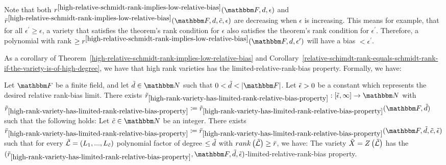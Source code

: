 \begin{remark}\label{in-high-relative-rank-implies-low-relative-bias-epsilon-increasing-rank-requirment-decreasing}
Note that both $\rankval^{\ref{high-relative-schmidt-rank-implies-low-relative-bias}}(\basefield, \degree, \epsilon)$
and $\varietyrankval^{\ref{high-relative-schmidt-rank-implies-low-relative-bias}}(\basefield, \degree, \varietypolycount, \epsilon)$
are decreasing when $\epsilon$ is increasing.
This means for example, that for all $\epsilon^\prime \geq \epsilon$,
a variety that satisfies the theorem's rank condition for $\epsilon$ also satisfies the theorem's rank condition for $\epsilon^\prime$.
Therefore, a polynomial with rank $\geq \rankval^{\ref{high-relative-schmidt-rank-implies-low-relative-bias}}(\basefield, \degree, \epsilon^\prime)$
will have a bias $< \epsilon^\prime$.
\end{remark}
As a corollary of Theorem~\ref{high-relative-schmidt-rank-implies-low-relative-bias} and Corollary~\ref{relative-schimdt-rank-equals-schmidt-rank-if-the-variety-is-of-high-degree}, we have that
high rank varieties has the limited-relative-rank-bias property.
Formally, we have:
\begin{corollary}\label{high-rank-variety-has-limited-rank-relative-bias-property}
    Let $\basefield$ be a finite field, and let $\varietydeg \in \naturalnumbersset$ such that $0 < \varietydeg < \abs{\basefield}$.
    Let ${\tilde{\epsilon}} > 0$ be a constant which represents the desired relative rank-bias limit.
    There exists $\funcdef{\rankbiasfunc_{\ref{high-rank-variety-has-limited-rank-relative-bias-property}}}{[\epsilonlimitedrankbias, \infty]}{\naturalnumbersset}$ with $\rankbiasfunc_{\ref{high-rank-variety-has-limited-rank-relative-bias-property}} \definedas \rankbiasfunc_{\ref{high-rank-variety-has-limited-rank-relative-bias-property}}(\basefield, \varietydeg)$
    such that the following holds:
    \newline
    Let $\varietypolycount \in \naturalnumbersset$ be an integer.
    There exists $\varietyrankval_{\ref{high-rank-variety-has-limited-rank-relative-bias-property}} \definedas \varietyrankval_{\ref{high-rank-variety-has-limited-rank-relative-bias-property}}(\basefield, \varietydeg, \varietypolycount, \epsilonlimitedrankbias)$ such that
    for every $\varpolyset = (\varpoly_1,...,\varpoly_{\varietypolycount})$ polynomial factor of degree $\leq \tilde{d}$ with $\rank{\varpolyset} \geq \varietyrankval$, we have:
    \newline
    The variety $\variety = \zerofunc{\varpolyset}$ has the $(\rankbiasfunc_{\ref{high-rank-variety-has-limited-rank-relative-bias-property}}, \basefield, \varietydeg, \epsilonlimitedrankbias)$-limited-relative-rank-bias property.
\end{corollary}
